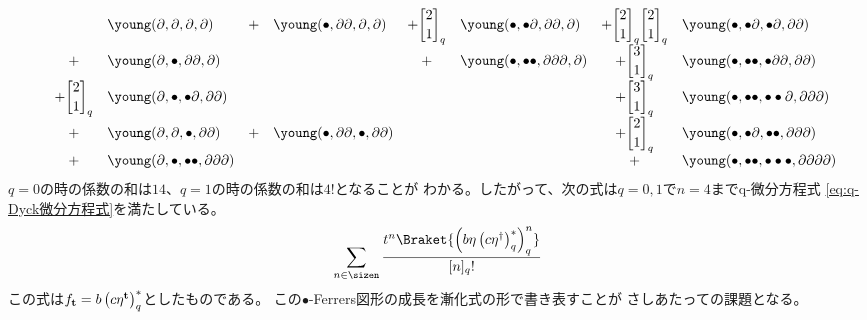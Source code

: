 {\begin{todo}[ここまで]
\begin{itemize}
\begin{equation*}
\begin{array}{rclclclcl}
				&& \young(\diff,\diff,\diff,\diff)
				&+& \young(\bullet,\diff\diff,\diff,\diff)
				&+\qbinom{2}{1}_q& \young(\bullet,\bullet\diff,\diff\diff,\diff)
				&+\qbinom{2}{1}_q\qbinom{2}{1}_q& \young(\bullet,\bullet\diff,\bullet\diff,\diff\diff) \\
				&+& \young(\diff,\bullet,\diff\diff,\diff)
				&&
				&+& \young(\bullet,\bullet\bullet,\diff\diff\diff,\diff)
				&+\qbinom{3}{1}_q& \young(\bullet,\bullet\bullet,\bullet\diff\diff,\diff\diff) \\
				&+\qbinom{2}{1}_q& \young(\diff,\bullet,\bullet\diff,\diff\diff)
				&& &&
				&+\qbinom{3}{1}_q& \young(\bullet,\bullet\bullet,\bullet\bullet\diff,\diff\diff\diff) \\
				&+& \young(\diff,\diff,\bullet,\diff\diff)
				&+& \young(\bullet,\diff\diff,\bullet,\diff\diff)
				&&
				&+\qbinom{2}{1}_q& \young(\bullet,\bullet\diff,\bullet\bullet,\diff\diff\diff) \\
				&+& \young(\diff,\bullet,\bullet\bullet,\diff\diff\diff)
				&& &&
				&+& \young(\bullet,\bullet\bullet,\bullet\bullet\bullet,\diff\diff\diff\diff)
			\end{array}\end{equation*}
			$q=0$の時の係数の和は$14$、$q=1$の時の係数の和は$4!$となることが
			わかる。したがって、次の式は$q=0,1$で$n=4$までq-微分方程式
			\eqref{eq:q-Dyck微分方程式}を満たしている。
			\begin{equation*}\begin{split}
				\sum_{n\in\sizen}\frac{t^n
					\Braket{\lr{b\eta\lr{c\eta^\dag}_q^*}_q^n}}{[n]_q!}
			\end{split}\end{equation*}
			この式は$f_{\mathbf{t}}=b\left({c\eta^{\mathbf{t}}}\right)_q^*$としたものである。
			この$\bullet$-Ferrers図形の成長を漸化式の形で書き表すことが
			さしあたっての課題となる。


\end{itemize}
\end{todo}}
